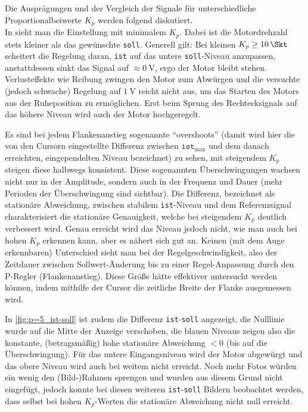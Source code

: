 \FloatBarrier
Die Ausprägungen und der Vergleich der Signale für unterschiedliche Proportionalbeiwerte \(K_p\) werden folgend diskutiert.\\
In  sieht man die Einstellung mit minimalem \(K_p\). Dabei ist die Motordrehzahl stets kleiner als das gewünschte \verb|soll|. Generell gilt: Bei kleinen \(K_p\geq\qty{10}{\Skt}\) scheitert die Regelung daran, \verb|ist| auf das untere \verb|soll|-Niveau anzupassen, anstattdessen sinkt das Signal auf \(\approx\qty{0}{\volt}\), ergo der Motor bleibt stehen. Verlusteffekte wie Reibung zwingen den Motor zum Abwürgen und die versuchte (jedoch schwache) Regelung auf \(\qty{1}{\volt}\) reicht nicht aus, um das Starten des Motors aus der Ruheposition zu ermöglichen. Erst beim Sprung des Rechtecksignals auf das höhere Niveau wird auch der Motor hochgeregelt.

Es sind bei jedem Flankenanstieg sogenannte \enquote{overshoots} (damit wird hier die von den Cursorn eingestellte Differenz zwischen \(\texttt{ist}_{\text{max}}\) und dem danach erreichten, eingependelten Niveau bezeichnet) zu sehen, mit steigendem \(K_p\) steigen diese halbwegs konsistent. Diese sogenannten Überschwingungen wachsen nicht nur in der Amplitude, sondern auch in der Frequenz und Dauer (mehr Perioden der Überschwingung sind sichtbar). Die Differenz, bezeichnet als stationäre Abweichung, zwischen stabilem \verb|ist|-Niveau und dem Referenzsignal charakterisiert die stationäre Genauigkeit, welche bei steigendem \(K_p\) deutlich verbessert wird. Genau erreicht wird das Niveau jedoch nicht, wie man auch bei hohen \(K_p\) erkennen kann, aber es nähert sich gut an. Keinen (mit dem Auge erkennbaren) Unterschied sieht man bei der Regelgeschwindigkeit, also der Zeitdauer zwischen Sollwert-Änderung bis zu einer Regel-Anpassung durch den P-Regler (Flankenanstieg). Diese Größe hätte effektiver untersucht werden können, indem mithilfe der Cursor die zeitliche Breite der Flanke ausgemessen wird.

In \cref{fig:p=5_ist-soll} ist zudem die Differenz \verb|ist|-\verb|soll| angezeigt, die Nulllinie wurde auf die Mitte der Anzeige verschoben, die blauen Niveaus zeigen also die konstante, (betragsmäßig) hohe stationäre Abweichung \(<0\) (bis auf die Überschwingung). Für das untere Eingangsniveau wird der Motor abgewürgt und das obere Niveau wird auch bei weitem nicht erreicht. Noch mehr Fotos würden ein wenig den (Bild-)Rahmen sprengen und wurden aus diesem Grund nicht eingefügt, jedoch konnte bei diesen weiteren \verb|ist|-\verb|soll| Bildern beobachtet werden, dass selbst bei hohen \(K_p\)-Werten die stationäre Abweichung nicht null erreicht.

